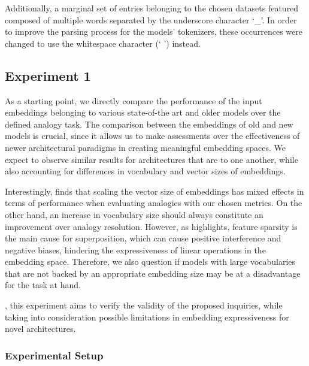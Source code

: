 Additionally, a marginal set of entries belonging to the chosen datasets featured  composed of multiple words separated by the underscore character `\_'.
In order to improve the parsing process for the models' tokenizers, these occurrences were changed to use the whitespace character (` ') instead.

\subsection{Experiment 1}\label{ssec:exp_emb_exp1}

As a starting point, we directly compare the performance of the input embeddings belonging to various state-of-the art and older models over the defined analogy task.
The comparison between the embeddings of old and new models is crucial, since it allows us to make assessments over the effectiveness of newer architectural paradigms in creating meaningful embedding spaces.
We expect to observe similar results for architectures that are  to one another, while also accounting for differences in vocabulary and vector sizes of embeddings.

Interestingly, \citet{drozd2016} finds that scaling the vector size of embeddings has mixed effects in terms of performance when evaluating analogies with our chosen metrics.
On the other hand, an increase in vocabulary size should always constitute an improvement over analogy resolution.
However, as \citet{elhage2022} highlights, feature sparsity is the main cause for superposition, which can cause positive interference and negative biases, hindering the expressiveness of linear operations in the embedding space.
Therefore, we also question if models with large vocabularies that are not backed by an appropriate embedding size may be at a disadvantage for the task at hand.

, this experiment aims to verify the validity of the proposed inquiries, while taking into consideration possible limitations in embedding expressiveness for novel architectures.

\subsubsection{Experimental Setup}\label{sssec:exp_emb_exp1_expset}

